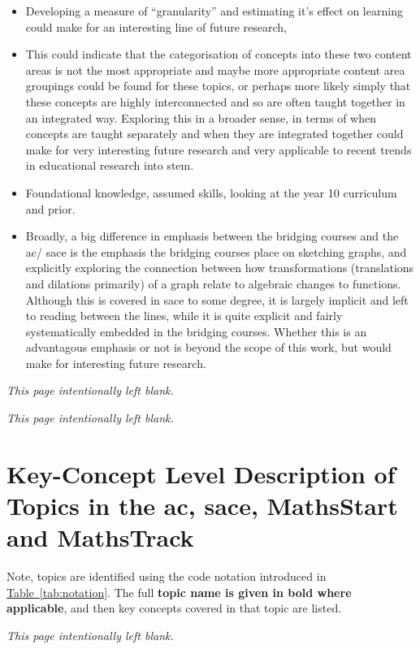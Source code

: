 \documentclass[twoside,12pt,a4paper]{report}
\makeatletter
\newcommand*{\intentionallyblankpage}{
  \vspace*{\fill}
  {\centering \textit{This page intentionally left blank.} \par}
  \vspace{\fill}}
\renewcommand*{\cleardoublepage}{\clearpage\if@twoside \ifodd\c@page\else
  \intentionallyblankpage
  \newpage
  \if@twocolumn\hbox{}\newpage\fi\fi\fi}
\newcommand{\reftab}[1]{\hyperref[tab:#1]{Table~\ref{tab:#1}}}
\makeatother
\begin{document}
\begin{itemize}
	\item Developing a measure of ``granularity'' and estimating it's effect on learning could make for an interesting line of future research,
	\item This could indicate that the categorisation of concepts into these two content areas is not the most appropriate and maybe more appropriate content area groupings could be found for these topics, or perhaps more likely simply that these concepts are highly interconnected and so are often taught together in an integrated way. Exploring this in a broader sense, in terms of when concepts are taught separately and when they are integrated together could make for very interesting future research and very applicable to recent trends in educational research into \gls{stem}.
\end{itemize}

\begin{itemize}
	\item Foundational knowledge, assumed skills, looking at the year 10 curriculum and prior.
\end{itemize}

\begin{itemize}
	\item Broadly, a big difference in emphasis between the bridging courses and the \gls{ac}/ \gls{sace} is the emphasis the bridging courses place on sketching graphs, and explicitly exploring the connection between how transformations (translations and dilations primarily) of a graph relate to algebraic changes to functions. Although this is covered in \gls{sace} to some degree, it is largely implicit and left to reading between the lines, while it is quite explicit and fairly systematically embedded in the bridging courses. Whether this is an advantagous emphasis or not is beyond the scope of this work, but would make for interesting future research.
\end{itemize}


\cleardoublepage
\begin{appendices}

\cleardoublepage
\chapter{Key-Concept Level Description of Topics in the \gls{ac}, \gls{sace}, MathsStart and MathsTrack}
\label{app:concepts}

Note, topics are identified using the code notation introduced in \reftab{notation}. The full \textbf{topic name is given in bold where applicable}, and then key concepts covered in that topic are listed.



\end{appendices}

\glsresetall
\cleardoublepage

 
\end{document}
